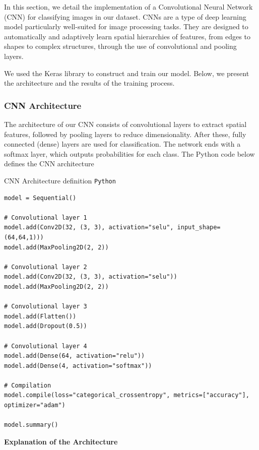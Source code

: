 \documentclass{modeleRapport}
\begin{document}
In this section, we detail the implementation of a Convolutional Neural Network (CNN) for classifying images in our dataset. 
CNNs are a type of deep learning model particularly well-suited for image processing tasks. They are designed to automatically 
and adaptively learn spatial hierarchies of features, from edges to shapes to complex structures, through the use of 
convolutional and pooling layers.

We used the Keras library to construct and train our model. Below, we present the architecture and the results of the 
training process.

\subsubsection{CNN Architecture}

The architecture of our CNN consists of convolutional layers to extract spatial features, followed by pooling layers 
to reduce dimensionality. After these, fully connected (dense) layers are used for classification. The network ends with a 
softmax layer, which outputs probabilities for each class. The Python code below defines the CNN architecture


\begin{codebox}{CNN Architecture definition \texttt{Python}}
\begin{lstlisting}
model = Sequential()

# Convolutional layer 1
model.add(Conv2D(32, (3, 3), activation="selu", input_shape=(64,64,1)))
model.add(MaxPooling2D(2, 2))

# Convolutional layer 2
model.add(Conv2D(32, (3, 3), activation="selu"))
model.add(MaxPooling2D(2, 2))

# Convolutional layer 3
model.add(Flatten())
model.add(Dropout(0.5))

# Convolutional layer 4
model.add(Dense(64, activation="relu"))
model.add(Dense(4, activation="softmax"))

# Compilation
model.compile(loss="categorical_crossentropy", metrics=["accuracy"], optimizer="adam")

model.summary()
\end{lstlisting}
\end{codebox}

\textbf{Explanation of the Architecture}
\end{document}
